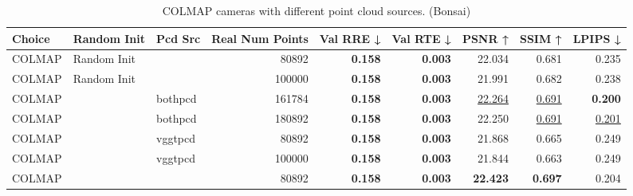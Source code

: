 \begin{table}[H]
\caption{COLMAP cameras with different point cloud sources. (Bonsai)}
\label{tab:06_isolated_cams_point_clouds_bonsai}
\small
\begin{tabular}{lllrrrrrr}
\toprule
Choice & Random Init & Pcd Src & Real Num Points & Val RRE ↓ & Val RTE ↓ & PSNR ↑ & SSIM ↑ & LPIPS ↓ \\
\midrule
COLMAP & Random Init &  & 80892 & \textbf{0.158} & \textbf{0.003} & 22.034 & 0.681 & 0.235 \\
COLMAP & Random Init &  & 100000 & \textbf{0.158} & \textbf{0.003} & 21.991 & 0.682 & 0.238 \\
COLMAP &  & bothpcd & 161784 & \textbf{0.158} & \textbf{0.003} & \underline{22.264} & \underline{0.691} & \textbf{0.200} \\
COLMAP &  & bothpcd & 180892 & \textbf{0.158} & \textbf{0.003} & 22.250 & \underline{0.691} & \underline{0.201} \\
COLMAP &  & vggtpcd & 80892 & \textbf{0.158} & \textbf{0.003} & 21.868 & 0.665 & 0.249 \\
COLMAP &  & vggtpcd & 100000 & \textbf{0.158} & \textbf{0.003} & 21.844 & 0.663 & 0.249 \\
COLMAP &  &  & 80892 & \textbf{0.158} & \textbf{0.003} & \textbf{22.423} & \textbf{0.697} & 0.204 \\
\bottomrule
\end{tabular}
\end{table}